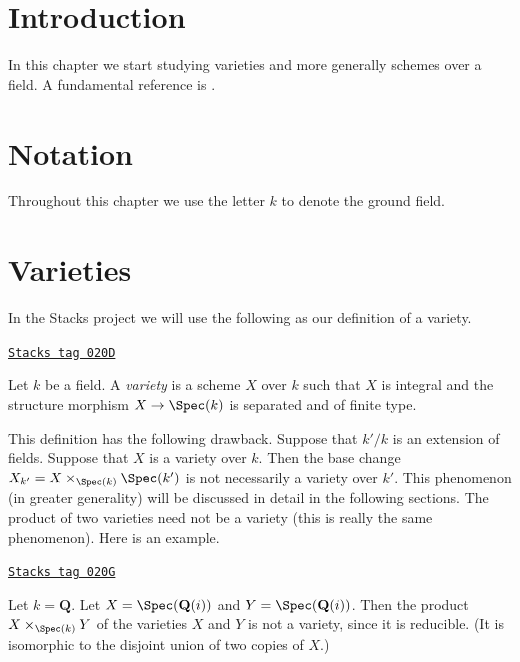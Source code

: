 \section{Introduction}
\label{varieties-section-introduction}
In this chapter we start studying varieties and more generally
schemes over a field. A fundamental reference is \cite{EGA}.

\section{Notation}
\label{varieties-section-notation}
Throughout this chapter we use the letter $k$ to denote the ground field.

\section{Varieties}
\label{varieties-section-varieties}
In the Stacks project we will use the following as our definition
of a variety.

\begin{definition}[Variety]
\label{varieties-definition-variety}
\href{https://stacks.math.columbia.edu/tag/020D}{\texttt{Stacks tag 020D}}

Let $k$ be a field. A {\it variety} is a scheme $X$ over $k$
such that $X$ is integral and the structure morphism
$X \to \Spec(k)$ is separated and of finite type.
\end{definition}

This definition has the following drawback. Suppose that
$k'/k$ is an extension of fields. Suppose that $X$
is a variety over $k$. Then the base change
$X_{k'} = X \times_{\Spec(k)} \Spec(k')$ is
not necessarily a variety over $k'$. This phenomenon (in greater
generality) will be discussed in detail in the following sections.
The product of two varieties need not be a variety
(this is really the same phenomenon). Here is an example.

\begin{example}
\label{varieties-example-product-not-a-variety}
\href{https://stacks.math.columbia.edu/tag/020G}{\texttt{Stacks tag 020G}}

Let $k = \mathbf{Q}$. Let $X = \Spec(\mathbf{Q}(i))$
and $Y = \Spec(\mathbf{Q}(i))$. Then the product
$X \times_{\Spec(k)} Y$ of the varieties $X$ and $Y$
is not a variety, since it is reducible. (It is isomorphic
to the disjoint union of two copies of $X$.)
\end{example}

